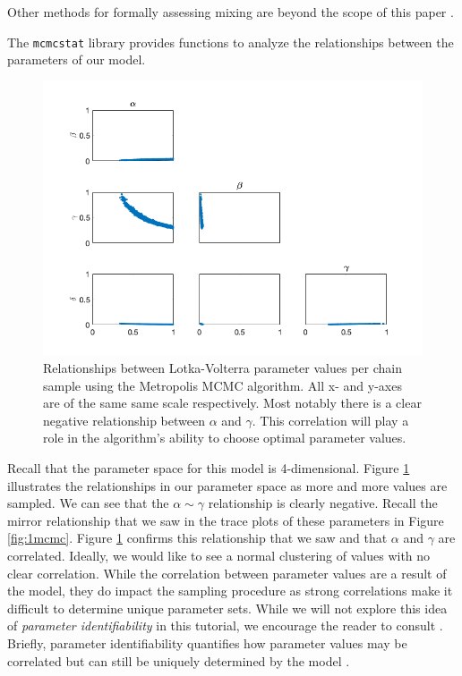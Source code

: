 Other methods for formally assessing mixing are beyond the scope of this paper \cite{convergence_mixing}.
\par The \texttt{mcmcstat} library provides functions to analyze the relationships between the parameters of our model.
\begin{figure}[H]
    \centering
    \includegraphics[width=15cm]{MCMC_figs/met_lv_final/final_mh_samples.png}
    \caption{Relationships between Lotka-Volterra parameter values per chain sample using the Metropolis MCMC algorithm. All x- and y-axes are of the same same scale respectively. Most notably there is a clear negative relationship between $\alpha$ and $\gamma$. This correlation will play a role in the algorithm's ability to choose optimal parameter values.}
    \label{fig:3mcmc}
\end{figure}
Recall that the parameter space for this model is 4-dimensional. Figure \ref{fig:3mcmc} illustrates the relationships in our parameter space as more and more values are sampled. We can see that the $\alpha \sim \gamma$ relationship is clearly negative. Recall the mirror relationship that we saw in the trace plots of these parameters in Figure \ref{fig:1mcmc}. Figure \ref{fig:3mcmc} confirms this relationship that we saw and that $\alpha$ and $\gamma$ are correlated. Ideally, we would like to see a normal clustering of values with no clear correlation. While the correlation between parameter values are a result of the model, they do impact the sampling procedure as strong correlations make it difficult to determine unique parameter sets. While we will not explore this idea of \emph{parameter identifiability} in this tutorial, we encourage the reader to consult \cite{smithCh8}. Briefly, parameter identifiability quantifies how parameter values may be correlated but can still be uniquely determined by the model \cite{smithCh8}.
